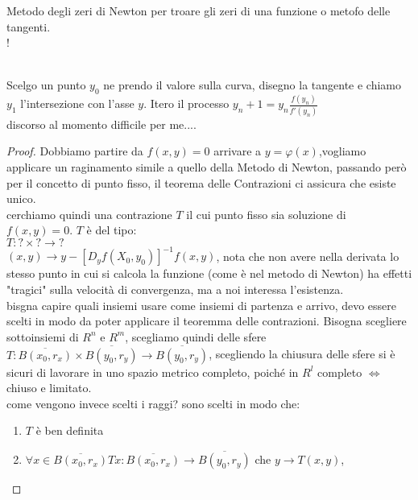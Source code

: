 \begin{theorem}
	\observation Metodo degli zeri di Newton per troare gli zeri di una funzione o metofo delle tangenti.\\
	\resizebox {\columnwidth} {!} {
	}\\
	Scelgo un punto $y_0$ ne prendo il valore sulla curva, disegno la tangente e chiamo $y_1$ l'intersezione con l'asse $y$. Itero il processo $y_n+1=y_n\frac{f(y_n)}{f'(y_n)}$\\
	discorso al momento difficile per me....\\
	\begin{proof}
		Dobbiamo partire da $f(x,y)=0$ arrivare a $y=\varphi(x)$,vogliamo applicare un raginamento simile a quello della Metodo di Newton, passando però per il concetto di punto fisso, il teorema delle Contrazioni ci assicura che esiste unico.\\
		cerchiamo quindi una contrazione $T$ il cui punto fisso sia soluzione di $f(x,y)=0$. $T$ è del tipo:\\
		$T:?\times ?\rightarrow ?$\\
		$(x,y)\rightarrow y-[D_yf(X_0,y_0)]^{-1}f(x,y)$, nota che non avere nella derivata lo stesso punto in cui si calcola la funzione (come è nel metodo di Newton) ha effetti "tragici" sulla velocità di convergenza, ma a noi interessa l'esistenza.\\
		bisgna capire quali insiemi usare come insiemi di partenza e arrivo, devo essere scelti in modo da poter applicare il teoremma delle contrazioni. Bisogna scegliere sottoinsiemi di $R^n$ e $R^m$, scegliamo quindi delle sfere\\
		$T:\overline{B(x_0,r_x)}\times\overline{B(y_0,r_y)}\rightarrow\overline{B(y_0,r_y)}$, scegliendo la chiusura delle sfere si è sicuri di lavorare in uno spazio metrico completo, poiché in $R^l$ completo $\iff$ chiuso e limitato.\\
		come vengono invece scelti i raggi? sono scelti in modo che:\\
		\begin{enumerate}
			\item $T$ è ben definita
			\item $\forall x \in \overline{B(x_0,r_x)} Tx: \overline{B(x_0,r_x)}\rightarrow\overline{B(y_0,r_y)}$ che $y\rightarrow T(x,y)$,\\

\end{enumerate}
\end{proof}
\end{theorem}
